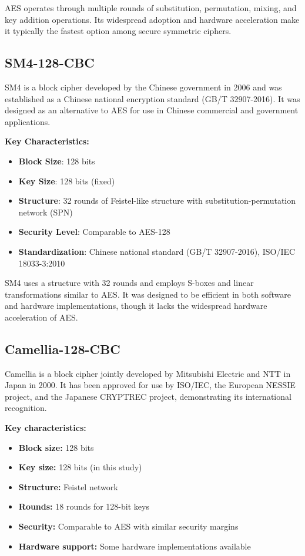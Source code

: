 \documentclass[12pt,a4paper]{article}
\begin{document}
AES operates through multiple rounds of substitution, permutation, mixing, and key addition operations. Its widespread adoption and hardware acceleration make it typically the fastest option among secure symmetric ciphers.

\subsection{SM4-128-CBC}
SM4 is a block cipher developed by the Chinese government in 2006 and was established as a Chinese national encryption standard (GB/T 32907-2016). It was designed as an alternative to AES for use in Chinese commercial and government applications.

\textbf{Key Characteristics:}
\begin{itemize}
    \item \textbf{Block Size}: 128 bits
    \item \textbf{Key Size}: 128 bits (fixed)
    \item \textbf{Structure}: 32 rounds of Feistel-like structure with substitution-permutation network (SPN)
    \item \textbf{Security Level}: Comparable to AES-128
    \item \textbf{Standardization}: Chinese national standard (GB/T 32907-2016), ISO/IEC 18033-3:2010
\end{itemize}

SM4 uses a structure with 32 rounds and employs S-boxes and linear transformations similar to AES. It was designed to be efficient in both software and hardware implementations, though it lacks the widespread hardware acceleration of AES.

\subsection{Camellia-128-CBC}
Camellia is a block cipher jointly developed by Mitsubishi Electric and NTT in Japan in 2000. It has been approved for use by ISO/IEC, the European NESSIE project, and the Japanese CRYPTREC project, demonstrating its international recognition.

\textbf{Key characteristics:}
\begin{itemize}
    \item \textbf{Block size:} 128 bits
    \item \textbf{Key size:} 128 bits (in this study)
    \item \textbf{Structure:} Feistel network
    \item \textbf{Rounds:} 18 rounds for 128-bit keys
    \item \textbf{Security:} Comparable to AES with similar security margins
    \item \textbf{Hardware support:} Some hardware implementations available
\end{itemize}
\end{document}
